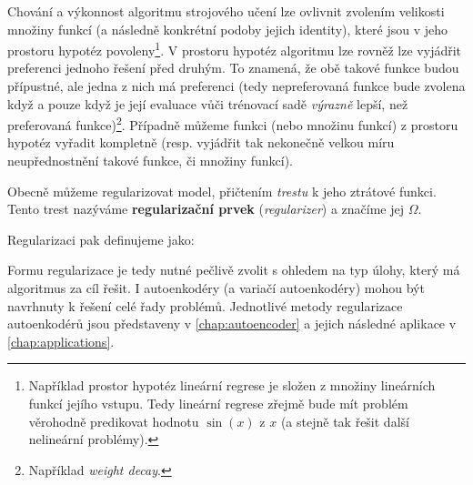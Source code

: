 Chování a výkonnost algoritmu strojového učení lze ovlivnit zvolením velikosti množiny funkcí (a následně konkrétní podoby jejich identity), které jsou v jeho prostoru hypotéz povoleny\footnote{Například prostor hypotéz lineární regrese je složen z množiny lineárních funkcí jejího vstupu. Tedy lineární regrese zřejmě bude mít problém věrohodně predikovat hodnotu $\sin(x)$ z $x$ (a stejně tak řešit další nelineární problémy).}.
V prostoru hypotéz algoritmu lze rovněž lze vyjádřit preferenci jednoho řešení před druhým.
To znamená, že obě takové funkce budou přípustné, ale jedna z nich má preferenci (tedy nepreferovaná funkce bude zvolena když a pouze když je její evaluace vůči trénovací sadě \emph{výrazně} lepší, než preferovaná funkce)\footnote{Například \emph{weight decay}.}.
Případně můžeme funkci (nebo množinu funkcí) z prostoru hypotéz vyřadit kompletně (resp. vyjádřit tak nekonečně velkou míru neupřednostnění takové funkce, či množiny funkcí). \cite{Goodfellow2016}

Obecně můžeme regularizovat model, přičtením \emph{trestu} k jeho ztrátové funkci. Tento trest nazýváme \textbf{regularizační prvek} (\emph{regularizer}) a značíme jej $\Omega$.

Regularizaci pak definujeme jako:
\begin{displayquote}
     \cite{Goodfellow2016}
\end{displayquote}

Formu regularizace je tedy nutné pečlivě zvolit s ohledem na typ úlohy, který má algoritmus za cíl řešit.
I autoenkodéry (a variačí autoenkodéry) mohou být navrhnuty k řešení celé řady problémů. Jednotlivé metody regularizace autoenkodérů jsou představeny v \autoref{chap:autoencoder} a jejich následné aplikace v \autoref{chap:applications}.





